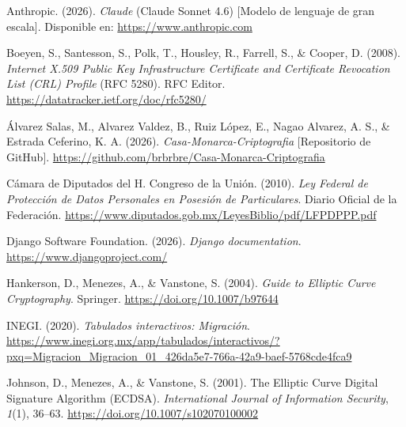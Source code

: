 \documentclass[10pt,letterpaper]{report}
\begin{document}
\begin{description}[leftmargin=0pt, labelwidth=0pt, labelsep=0pt, itemindent=0pt, itemsep=8pt]

    \item[\hypertarget{ref:anthropic2026}{}]
    Anthropic. (2026). \textit{Claude} (Claude Sonnet 4.6) [Modelo de lenguaje de gran escala]. Disponible en: \url{https://www.anthropic.com}

    \item[\hypertarget{ref:boeyen2008}{}]
    Boeyen, S., Santesson, S., Polk, T., Housley, R., Farrell, S., \& Cooper, D. (2008). \textit{Internet X.509 Public Key Infrastructure Certificate and Certificate Revocation List (CRL) Profile} (RFC 5280). RFC Editor. \url{https://datatracker.ietf.org/doc/rfc5280/}


    \item[\hypertarget{ref:repo2026}{}]
    Álvarez Salas, M., Alvarez Valdez, B., Ruiz López, E., Nagao Alvarez, A. S., \& Estrada Ceferino, K. A. (2026). \textit{Casa-Monarca-Criptografia} [Repositorio de GitHub]. \url{https://github.com/brbrbre/Casa-Monarca-Criptografia}

    \item[\hypertarget{ref:camara2010}{}]
    Cámara de Diputados del H. Congreso de la Unión. (2010). \textit{Ley Federal de Protección de Datos Personales en Posesión de Particulares}. Diario Oficial de la Federación. \url{https://www.diputados.gob.mx/LeyesBiblio/pdf/LFPDPPP.pdf}

    \item[\hypertarget{ref:django2026}{}]
    Django Software Foundation. (2026). \textit{Django documentation}. \url{https://www.djangoproject.com/}

    \item[\hypertarget{ref:hankerson2004}{}]
    Hankerson, D., Menezes, A., \& Vanstone, S. (2004). \textit{Guide to Elliptic Curve Cryptography}. Springer. \url{https://doi.org/10.1007/b97644}

    \item[\hypertarget{ref:inegi2020}{}]
    INEGI. (2020). \textit{Tabulados interactivos: Migración}. \url{https://www.inegi.org.mx/app/tabulados/interactivos/?pxq=Migracion_Migracion_01_426da5e7-766a-42a9-baef-5768cde4fca9}

    \item[\hypertarget{ref:johnson2001}{}]
    Johnson, D., Menezes, A., \& Vanstone, S. (2001). The Elliptic Curve Digital Signature Algorithm (ECDSA). \textit{International Journal of Information Security}, \textit{1}(1), 36--63. \url{https://doi.org/10.1007/s102070100002}


\end{description}
\end{document}
